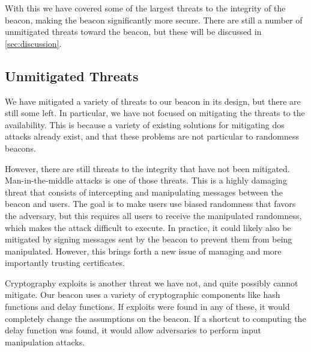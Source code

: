 \bigskip
With this we have covered some of the largest threats to the integrity of the beacon, making the beacon significantly more secure.
There are still a number of unmitigated threats toward the beacon, but these will be discussed in \vref{sec:discussion}.




\subsection{Unmitigated Threats}
We have mitigated a variety of threats to our beacon in its design, but there are still some left.
In particular, we have not focused on mitigating the threats to the availability.
This is because a variety of existing solutions for mitigating \gls{dos} attacks already exist, and that these problems are not particular to randomness beacons.

However, there are still threats to the integrity that have not been mitigated.
Man-in-the-middle attacks is one of those threats.
This is a highly damaging threat that consists of intercepting and manipulating messages between the beacon and users.
The goal is to make users use biased randomness that favors the adversary, but this requires all users to receive the manipulated randomness, which makes the attack difficult to execute.
In practice, it could likely also be mitigated by signing messages sent by the beacon to prevent them from being manipulated.
However, this brings forth a new issue of managing and more importantly trusting certificates.

Cryptography exploits is another threat we have not, and quite possibly cannot mitigate.
Our beacon uses a variety of cryptographic components like hash functions and delay functions.
If exploits were found in any of these, it would completely change the assumptions on the beacon.
If a shortcut to computing the delay function was found, it would allow adversaries to perform input manipulation attacks.
